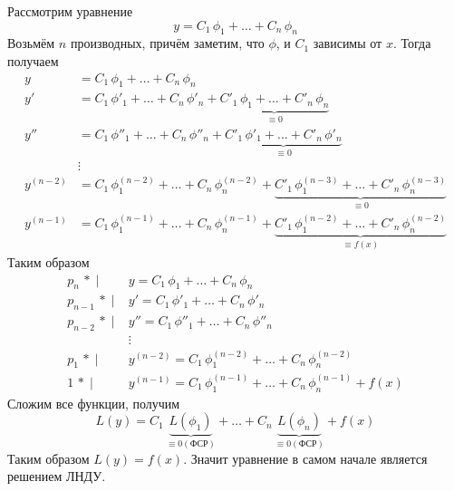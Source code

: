 \begin{Proof}
    Рассмотрим уравнение 
    \[
        y = C_1\,\phi_1 + \dots + C_n\,\phi_n
    \]
    Возьмём $n$ производных, причём заметим, что $\phi$, и $C_1$ зависимы от $x$. Тогда получаем
    \begin{align*}
        y &= C_1\,\phi_1 + \dots + C_n\,\phi_n\\
        y' &= C_1\,\phi'_1 + \dots + C_n\,\phi'_n +  \underbrace{C'_1\,\phi_1 + \dots + C'_n\,\phi_n}_{\equiv 0}\\
        y'' &= C_1\,\phi''_1 + \dots + C_n\,\phi''_n + \underbrace{C'_1\,\phi'_1 + \dots + C'_n\,\phi'_n}_{\equiv 0}\\
        &\vdots\\
        y^{(n-2)} &= C_1\,\phi_1^{(n-2)} + \dots + C_n\,\phi_n^{(n-2)} + \underbrace{C'_1\,\phi^{(n-3)}_1 + \dots + C'_n\,\phi^{(n-3)}_n}_{\equiv 0}\\
        y^{(n-1)} &= C_1\,\phi_1^{(n-1)} + \dots + C_n\,\phi_n^{(n-1)} + \underbrace{C'_1\,\phi^{(n-2)}_1 + \dots + C'_n\,\phi^{(n-2)}_n}_{\equiv f(x)}
    \end{align*}
    Таким образом
    \begin{align*}
        p_n\,*\; |\; &y = C_1\,\phi_1 + \dots + C_n\,\phi_n\\
        p_{n-1}\,*\; |\; &y' = C_1\,\phi'_1 + \dots + C_n\,\phi'_n\\
        p_{n-2}\,*\; |\; &y'' = C_1\,\phi''_1 + \dots + C_n\,\phi''_n\\
         & \vdots\\
        p_1\,*\; |\; &y^{(n-2)} = C_1\,\phi_1^{(n-2)} + \dots + C_n\,\phi_n^{(n-2)}\\
        1\,*\; |\; &y^{(n-1)} = C_1\,\phi_1^{(n-1)} + \dots + C_n\,\phi_n^{(n-1)} +  f(x)
    \end{align*}
    Сложим все функции, получим
    \[
        L(y) = C_1\,\underbrace{L(\phi_1)}_{\equiv 0 (\text{ФСР})} + \dots + C_n\,\underbrace{L(\phi_n)}_{\equiv 0 (\text{ФСР})} + f(x) 
    \]
    Таким образом $L(y) = f(x)$. Значит уравнение в самом начале является решением ЛНДУ.\\
    

\end{Proof}
